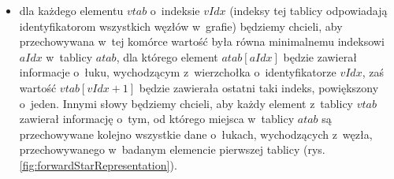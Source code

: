 \begin{itemize}
\item dla każdego elementu $vtab$ o~indeksie $vIdx$ (indeksy tej tablicy odpowiadają identyfikatorom wszystkich węzłów w~grafie) będziemy chcieli, aby przechowywana w~tej komórce wartość była równa minimalnemu indeksowi $aIdx$ w~tablicy $atab$, dla którego element $atab \left[ aIdx \right] $ będzie zawierał informacje o~łuku, wychodzącym z~wierzchołka o~identyfikatorze $vIdx$, zaś wartość $vtab \left[ vIdx+1 \right] $ będzie zawierała ostatni taki indeks, powiększony o~jeden. Innymi słowy będziemy chcieli, aby każdy element z~tablicy $vtab$ zawierał informację o~tym, od którego miejsca w~tablicy $atab$ są przechowywane kolejno wszystkie dane o~łukach, wychodzących z~węzła, przechowywanego w~badanym elemencie pierwszej tablicy (rys. \ref{fig:forwardStarRepresentation}).
\end{itemize}

